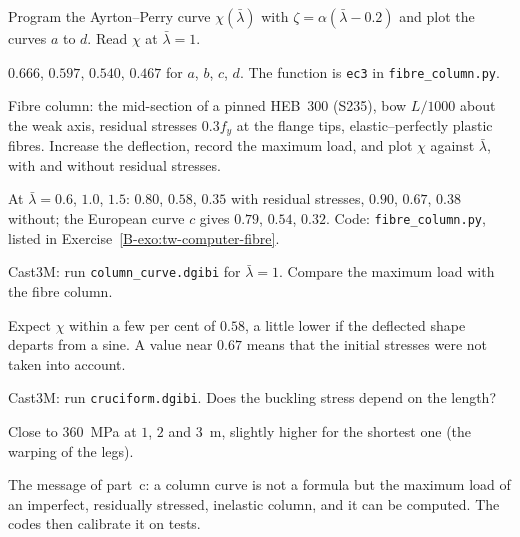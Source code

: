 \qc Program the Ayrton--Perry curve $\chi(\bar\lambda)$ with $\zeta = \alpha(\bar\lambda - 0.2)$ and plot the curves $a$ to $d$. Read
$\chi$ at $\bar\lambda = 1$.
\begin{answer}
$0.666$, $0.597$, $0.540$, $0.467$ for $a$, $b$, $c$, $d$. The function is \texttt{ec3} in \texttt{fibre\_column.py}.
\end{answer}


\qc Fibre column: the mid-section of a pinned HEB~300 (S235), bow $L/1000$ about the weak axis, residual stresses
$0.3f_y$ at the flange tips, elastic--perfectly plastic fibres. Increase the deflection, record the maximum load, and
plot $\chi$ against $\bar\lambda$, with and without residual stresses.
\begin{answer}
At $\bar\lambda = 0.6$, $1.0$, $1.5$: $0.80$, $0.58$, $0.35$ with residual stresses, $0.90$, $0.67$, $0.38$ without; the
European curve $c$ gives $0.79$, $0.54$, $0.32$. Code: \texttt{fibre\_column.py}, listed in
Exercise~\ref{B-exo:tw-computer-fibre}.
\end{answer}

\qc Cast3M: run \texttt{column\_curve.dgibi} for $\bar\lambda = 1$. Compare the maximum load with the fibre column.
\begin{answer}
Expect $\chi$ within a few per cent of $0.58$, a little lower if the deflected shape departs from a sine. A value
near $0.67$ means that the initial stresses were not taken into account.
\end{answer}

\qc Cast3M: run \texttt{cruciform.dgibi}. Does the buckling stress depend on the length?
\begin{answer}
Close to $360$~MPa at $1$, $2$ and $3$~m, slightly higher for the shortest one (the warping of the legs).
\end{answer}

\begin{instructor}
The message of part~c: a column curve is not a formula but the maximum load of an imperfect, residually
stressed, inelastic column, and it can be computed. The codes then calibrate it on tests.
\end{instructor}
